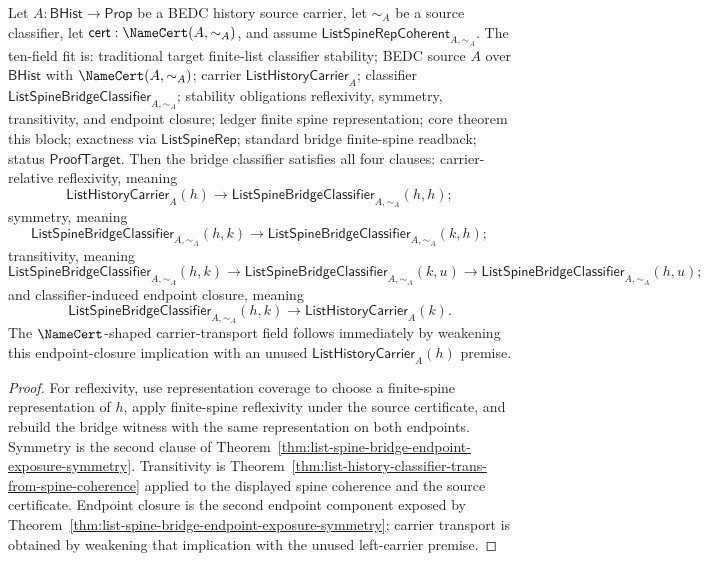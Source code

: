 \begin{theorem}
\label{thm:list-spine-bridge-stability-from-spine-coherence}
Let $A:\mathsf{BHist}\to\mathsf{Prop}$ be a BEDC history source carrier, let
$\sim_A$ be a source classifier, let $\mathsf{cert}:\NameCert(A,\sim_A)$, and
assume $\mathsf{ListSpineRepCoherent}_{A,\sim_A}$. The ten-field fit is:
traditional target finite-list classifier stability; BEDC source $A$ over
$\mathsf{BHist}$ with $\NameCert(A,\sim_A)$; carrier
$\mathsf{ListHistoryCarrier}_A$; classifier
$\mathsf{ListSpineBridgeClassifier}_{A,\sim_A}$; stability obligations
reflexivity, symmetry, transitivity, and endpoint closure; ledger finite spine
representation; core theorem this block; exactness via $\mathsf{ListSpineRep}$;
standard bridge finite-spine readback; status $\mathsf{ProofTarget}$. Then the
bridge classifier satisfies all four clauses: carrier-relative reflexivity,
meaning
$$
\mathsf{ListHistoryCarrier}_A(h)\to
\mathsf{ListSpineBridgeClassifier}_{A,\sim_A}(h,h);
$$
symmetry, meaning
$$
\mathsf{ListSpineBridgeClassifier}_{A,\sim_A}(h,k)\to
\mathsf{ListSpineBridgeClassifier}_{A,\sim_A}(k,h);
$$
transitivity, meaning
$$
\mathsf{ListSpineBridgeClassifier}_{A,\sim_A}(h,k)\to
\mathsf{ListSpineBridgeClassifier}_{A,\sim_A}(k,u)\to
\mathsf{ListSpineBridgeClassifier}_{A,\sim_A}(h,u);
$$
and classifier-induced endpoint closure, meaning
$$
\mathsf{ListSpineBridgeClassifier}_{A,\sim_A}(h,k)\to
\mathsf{ListHistoryCarrier}_A(k).
$$
The $\NameCert$-shaped carrier-transport field follows immediately by weakening
this endpoint-closure implication with an unused
$\mathsf{ListHistoryCarrier}_A(h)$ premise.
\end{theorem}
\begin{proof}
For reflexivity, use representation coverage to choose a finite-spine
representation of $h$, apply finite-spine reflexivity under the source
certificate, and rebuild the bridge witness with the same representation on both
endpoints. Symmetry is the second clause of
Theorem~\ref{thm:list-spine-bridge-endpoint-exposure-symmetry}. Transitivity is
Theorem~\ref{thm:list-history-classifier-trans-from-spine-coherence} applied to
the displayed spine coherence and the source certificate. Endpoint closure is
the second endpoint component exposed by
Theorem~\ref{thm:list-spine-bridge-endpoint-exposure-symmetry}; carrier
transport is obtained by weakening that implication with the unused left-carrier
premise.
\end{proof}

